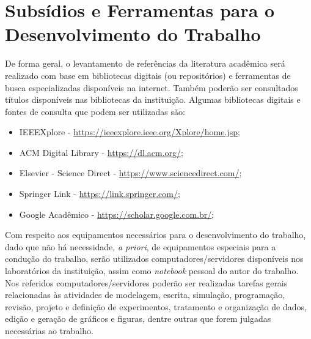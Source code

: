 \documentclass[tese-proposta,nocipinfo]{texufpel}
\begin{document}
\section{Subsídios e Ferramentas para o Desenvolvimento do Trabalho}
De forma geral, o levantamento de referências da literatura acadêmica será realizado com base em bibliotecas digitais (ou repositórios) e ferramentas de busca especializadas disponíveis na internet. Também poderão ser consultados títulos disponíveis nas bibliotecas da instituição. Algumas bibliotecas digitais e fontes de consulta que podem ser utilizadas são:
\begin{itemize}
\item IEEEXplore - \url{https://ieeexplore.ieee.org/Xplore/home.jsp};
\item ACM Digital Library - \url{https://dl.acm.org/};
\item Elsevier - Science Direct - \url{https://www.sciencedirect.com/};
\item Springer Link - \url{https://link.springer.com/};
\item Google Acadêmico - \url{https://scholar.google.com.br/};
\end{itemize}

Com respeito aos equipamentos necessários para o desenvolvimento do trabalho, dado que não há necessidade, \textit{a priori}, de equipamentos especiais para a condução do trabalho, serão utilizados computadores/servidores disponíveis nos laboratórios da instituição, assim como \textit{notebook} pessoal do autor do trabalho. Nos referidos computadores/servidores poderão ser realizadas tarefas gerais relacionadas às atividades de modelagem, escrita, simulação, programação, revisão, projeto e definição de experimentos, tratamento e organização de dados, edição e geração de gráficos e figuras, dentre outras que forem julgadas necessárias ao trabalho.
\end{document}
